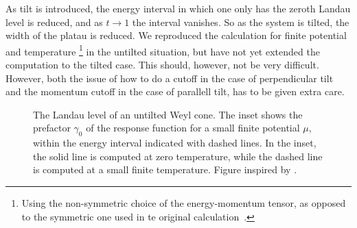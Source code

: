 As tilt is introduced, the energy interval in which one only has the zeroth Landau level is reduced, and as \( t \to 1 \) the interval vanishes.
So as the system is tilted, the width of the platau is reduced.
We reproduced the calculation for finite potential and temperature%
\footnote{Using the non-symmetric choice of the energy-momentum tensor, as opposed to the symmetric one used in te original calculation~\cite{arjonaFingerprintsConformalAnomaly2019}.}
in the untilted situation, but have not yet extended the computation to the tilted case.
This should, however, not be very difficult.
However, both the issue of how to do a cutoff in the case of perpendicular tilt and the momentum cutoff in the case of parallell tilt, has to be given extra care.


\begin{figure}[htb]
  \centering
  
  \caption{The Landau level of an untilted Weyl cone.
    The inset shows the prefactor \( \gamma_0 \) of the response function for a small finite potential \( \mu \), within the energy interval indicated with dashed lines.
    In the inset, the solid line is computed at zero temperature, while the dashed line is computed at a small finite temperature.
    Figure inspired by \textcite{arjonaFingerprintsConformalAnomaly2019}.
    }
    \label{fig:platau}
\end{figure}
